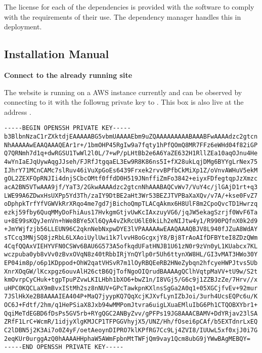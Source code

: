 The license for each of the dependencies is provided with the software to comply with the requirements of their use. The dependency manager  handles this in deployment.

\subsection{Installation Manual}

\textbf{Connect to the already running site}

The website is running on a AWS instance currently and can be observed by connecting
to it with the followng private key to . This box is also live
at the address .

\begin{verbatim}
-----BEGIN OPENSSH PRIVATE KEY-----
b3BlbnNzaC1rZXktdjEAAAAABG5vbmUAAAAEbm9uZQAAAAAAAAABAAABFwAAAAdzc2gtcn
NhAAAAAwEAAQAAAQEAr1r+/1bmOHP45RgIw9a7fqty1hPfQOmQ8MR7FFz6eWHd04f82iGP
Q7QRNmh7d1q+dwRGSU1TwWl2l0L/7+wP/pLHtBb2e6A6YaZE632H1RllZEa10aqOJnu4He
4wYnIaEJqUywAqgJJseh/FJRfJtgqaEL3Ew9R8K86ns5I+fX28ukLqjDMg6BYYgLrNex75
IJhrY71MCnCAMc7slRuv46iVuXpGoEs6439Frxek2rvvBPfbCkMiXp1Z/oVnvAWHuV5ekM
gOL2ZEXFOpRNJIi4dnjSCbcOMtf0ffdD0H519JNnffiZmFo3842+eiyxFDfegtqpJzXmzc
acA2BN5VTwAAA9jf/YaT3/2GkwAAAAdzc2gtcnNhAAABAQCvWv7/VuY4c/jlGAjD1rt+q3
LWE99A6ZDwxHsUXPp5Yd3Th/zaIY9DtBE2aHt3Wr53BEZJTVPBaXaXQv/v7A/+kse0FvZ7
oDphpkTrfYfVGWVkRrXRqo4me7gd7jBichoQmpTLACqAkmx6H8UlF8m2CpoQvcTD1Hwrzq
ezkj59fby6QuqMMyDoFhiAus17HvkgmGtjvUwKcIAxzuyVG6/jqJW5ekagSzrjf0WvF6Ta
u+8E99sKQyJenVn+hWe8BYe5Xl6QyA4vZkRcU6lE0kiLh2eNIJtw4y1/R990PQfnX0k2d9
+JmYWjfzjb56LLEUN96C2qknNebNxpwDYE3lVPAAAAAwEAAQAAAQBJV8L940fJZuA8WdAY
sTCcq3MNjSQ8jzRbL6LXAoiUylUwi1k7lvvH8oGcgxjY8/Bj8TrAoAIfDFBYteI8ZDzQWm
4CqfQQAxVIEHYVFN0CSWv6BAU6G573A5ofkqdUFatHNJB1U61zN0r9zVn0yL1KUabcx7KL
wczpuba0yb8vVv0zBvxOVqN8z40tRbbIRjYnQYlp0r5Uh6ttynXW8HL/GI3vMAT3HWo30Y
EP04im8p/o6p1KDppod+OhW2qatVHSvR7m1lOyRBQEeRB2HNeZybqn2hfcyeHWPJtvs5Ub
XnrXOqGW/lKcxpgz6ouvAlH26ctB6QjTofNgoOIQrudBAAAAgQClhVqtpMaVV+tU9w/S2t
kmOvrpCyCHuk+tgpTpuPZvwLKILHbh1bXO6+bwZ1n/I8VGj5/G6c9j1ZZBJzZe/7Hrv//x
uHPC0KQCLaX9mBvxIStMh2sz8nNUV+GPcTawkpnKXlnsSgGa2A0q1+05XGCjfvEv+92mur
7JSlHkXe2B8AAAAIEA404P+MaQ7jyypKQ7QqXcjKJXvfLynIZbJoi/3urh4UcsEQPc6u/K
OC6J+Fdtf/2hm/q1HePSiaX8Jxb94wMMPomJtvra6uigLXuaEMluIbG6Ph1CTQOBXYbr1+
QqiMeTdEGBD6fDsPs5GV5rb+RYgQGC2ANByZvv/gPFPs19JG8AAACBAMV+DdYRjav23lSA
ZRfF1LrC+WcmR/1idjyXlgKMJCP1TFPGGVhyjX5/UNZ/Hh/fOsei6pCAf/b5EXTdnrLxEQ
C2lDBN5j2K3Ai7o0Z4yF/oetAeoynDIPRO7klKPfRG7Cc9Lj4ZVI8/IUUwL5xf0xjJ0i7G
2eqKUr0urggAzQ0hAAAAHHphaW5AWmFpbnMtTWFjQm9vay1Qcm8ubG9jYWwBAgMEBQY=
-----END OPENSSH PRIVATE KEY-----
\end{verbatim}

